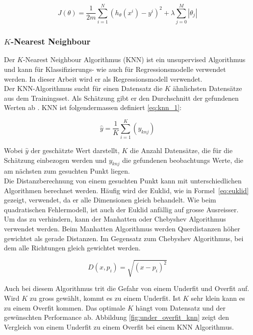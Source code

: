 \begin{equation}\label{eq:lasso}
J(\theta) = \frac{1}{2m} \sum_{i=1}^{N} (h_\theta(x^i) - y^i)^2 + \lambda \sum_{j=0}^{M} |\theta_j|
\end{equation}

\subsubsection{$K$-Nearest Neighbour}
Der $K$-Nearest Neighbour Algorithmus (KNN) ist ein unsupervised Algorithmus und kann für Klassifizierungs- wie auch für Regressionsmodelle verwendet werden. In dieser Arbeit wird er als Regressionsmodell verwendet.\\
Der KNN-Algorithmus sucht für einen Datensatz die $K$ ähnlichsten Datensätze aus dem Trainingsset. Als Schätzung gibt er den Durchschnitt der gefundenen Werten ab \cite{knn_1}. KNN ist folgendermassen definiert \eqref{eq:knn_1}:

\begin{equation}\label{eq:knn_1}
\hat{y} = \frac{1}{K} \sum_{i=1}^{K} (y_{knj})
\end{equation}

Wobei $\hat{y}$ der geschätzte Wert darstellt, $K$ die Anzahl Datensätze, die für die Schätzung einbezogen werden und $y_{knj}$ die gefundenen beobachtungs Werte, die am nächsten zum gesuchten Punkt liegen.\\
Die Distanzberechnung von einem gesuchten Punkt kann mit unterschiedlichen Algorithmen berechnet werden. Häufig wird der Euklid, wie in Formel~\eqref{eq:euklid} gezeigt, verwendet, da er alle Dimensionen gleich behandelt. Wie beim quadratischen Fehlermodell, ist auch der Euklid anfällig auf grosse Ausreisser. Um das zu verhindern, kann der Manhatten oder Chebyshev Algorithmus verwendet werden. Beim Manhatten Algorithmus werden Querdistanzen höher gewichtet als gerade Distanzen. Im Gegensatz zum Chebyshev Algorithmus, bei dem alle Richtungen gleich gewichtet werden.

\begin{equation}\label{eq:euklid}
D(x, p_i) = \sqrt{(x - p_i)^2}
\end{equation}

Auch bei diesem Algorithmus trit die Gefahr von einem Underfit und Overfit auf. Wird $K$ zu gross gewählt, kommt es zu einem Underfit. Ist $K$ sehr klein kann es zu einem Overfit kommen. Das optimale $K$ hängt vom Datensatz und der gewünschten Performance ab. Abbildung \ref{fig:under_overfit_knn} zeigt den Vergleich von einem Underfit zu einem Overfit bei einem KNN Algorithmus.

